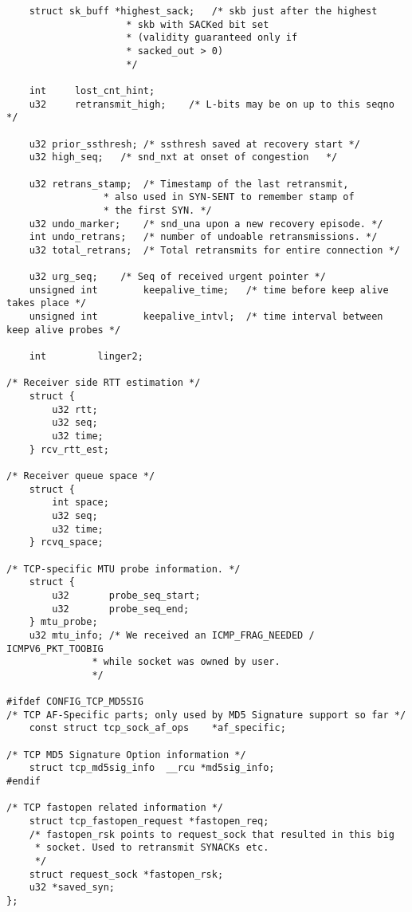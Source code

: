 \begin{verbatim}
    struct sk_buff *highest_sack;   /* skb just after the highest
                     * skb with SACKed bit set
                     * (validity guaranteed only if
                     * sacked_out > 0)
                     */

    int     lost_cnt_hint;
    u32     retransmit_high;    /* L-bits may be on up to this seqno */

    u32 prior_ssthresh; /* ssthresh saved at recovery start */
    u32 high_seq;   /* snd_nxt at onset of congestion   */

    u32 retrans_stamp;  /* Timestamp of the last retransmit,
                 * also used in SYN-SENT to remember stamp of
                 * the first SYN. */
    u32 undo_marker;    /* snd_una upon a new recovery episode. */
    int undo_retrans;   /* number of undoable retransmissions. */
    u32 total_retrans;  /* Total retransmits for entire connection */

    u32 urg_seq;    /* Seq of received urgent pointer */
    unsigned int        keepalive_time;   /* time before keep alive takes place */
    unsigned int        keepalive_intvl;  /* time interval between keep alive probes */

    int         linger2;

/* Receiver side RTT estimation */
    struct {
        u32 rtt;
        u32 seq;
        u32 time;
    } rcv_rtt_est;

/* Receiver queue space */
    struct {
        int space;
        u32 seq;
        u32 time;
    } rcvq_space;

/* TCP-specific MTU probe information. */
    struct {
        u32       probe_seq_start;
        u32       probe_seq_end;
    } mtu_probe;
    u32 mtu_info; /* We received an ICMP_FRAG_NEEDED / ICMPV6_PKT_TOOBIG
               * while socket was owned by user.
               */

#ifdef CONFIG_TCP_MD5SIG
/* TCP AF-Specific parts; only used by MD5 Signature support so far */
    const struct tcp_sock_af_ops    *af_specific;

/* TCP MD5 Signature Option information */
    struct tcp_md5sig_info  __rcu *md5sig_info;
#endif

/* TCP fastopen related information */
    struct tcp_fastopen_request *fastopen_req;
    /* fastopen_rsk points to request_sock that resulted in this big
     * socket. Used to retransmit SYNACKs etc.
     */
    struct request_sock *fastopen_rsk;
    u32 *saved_syn;
};
\end{verbatim}
